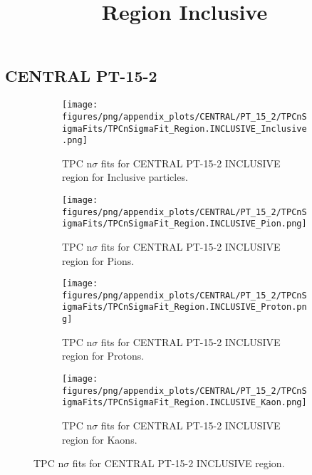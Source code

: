             \subsection{CENTRAL PT-15-2}
            \begin{figure}[H]
                \title{Region Inclusive}
                \begin{subfigure}[b]{0.5\textwidth}
                    \centering
                    \texttt{[image: figures/png/appendix\_plots/CENTRAL/PT\_15\_2/TPCnSigmaFits/TPCnSigmaFit\_Region.INCLUSIVE\_Inclusive.png]}
                    \caption{TPC n$\sigma$ fits for CENTRAL PT-15-2 INCLUSIVE region for Inclusive particles.}
                    \label{fig:appendix_CENTRAL_PT-15-2_INCLUSIVE_Inclusive}
                \end{subfigure}
                \begin{subfigure}[b]{0.5\textwidth}
                    \centering
                    \texttt{[image: figures/png/appendix\_plots/CENTRAL/PT\_15\_2/TPCnSigmaFits/TPCnSigmaFit\_Region.INCLUSIVE\_Pion.png]}
                    \caption{TPC n$\sigma$ fits for CENTRAL PT-15-2 INCLUSIVE region for Pions.}
                    \label{fig:appendix_CENTRAL_PT-15-2_INCLUSIVE_Pion}
                \end{subfigure}
                \begin{subfigure}[b]{0.5\textwidth}
                    \centering
                    \texttt{[image: figures/png/appendix\_plots/CENTRAL/PT\_15\_2/TPCnSigmaFits/TPCnSigmaFit\_Region.INCLUSIVE\_Proton.png]}
                    \caption{TPC n$\sigma$ fits for CENTRAL PT-15-2 INCLUSIVE region for Protons.}
                    \label{fig:appendix_CENTRAL_PT-15-2_INCLUSIVE_Proton}
                \end{subfigure}
                \begin{subfigure}[b]{0.5\textwidth}
                    \centering
                    \texttt{[image: figures/png/appendix\_plots/CENTRAL/PT\_15\_2/TPCnSigmaFits/TPCnSigmaFit\_Region.INCLUSIVE\_Kaon.png]}
                    \caption{TPC n$\sigma$ fits for CENTRAL PT-15-2 INCLUSIVE region for Kaons.}
                    \label{fig:appendix_CENTRAL_PT-15-2_INCLUSIVE_Kaon}
                \end{subfigure}
                \caption{TPC n$\sigma$ fits for CENTRAL PT-15-2 INCLUSIVE region.}
                \label{fig:appendix_CENTRAL_PT-15-2_INCLUSIVE}
            \end{figure}
